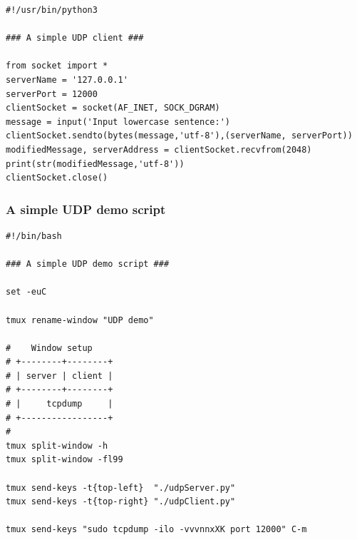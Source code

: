 \documentclass{article}
\begin{document}
\begin{verbatim}
#!/usr/bin/python3

### A simple UDP client ###

from socket import *
serverName = '127.0.0.1'
serverPort = 12000
clientSocket = socket(AF_INET, SOCK_DGRAM)
message = input('Input lowercase sentence:')
clientSocket.sendto(bytes(message,'utf-8'),(serverName, serverPort))
modifiedMessage, serverAddress = clientSocket.recvfrom(2048)
print(str(modifiedMessage,'utf-8'))
clientSocket.close()
\end{verbatim}
\subsubsection{A simple UDP demo script}
\label{sec:org180bdf7}

\begin{verbatim}
#!/bin/bash

### A simple UDP demo script ###

set -euC

tmux rename-window "UDP demo"

#    Window setup
# +--------+--------+
# | server | client |
# +--------+--------+
# |     tcpdump     |
# +-----------------+
#
tmux split-window -h
tmux split-window -fl99

tmux send-keys -t{top-left}  "./udpServer.py" 
tmux send-keys -t{top-right} "./udpClient.py"

tmux send-keys "sudo tcpdump -ilo -vvvnnxXK port 12000" C-m
\end{verbatim}
\end{document}
